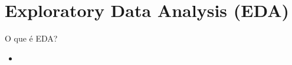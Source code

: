 \section{Exploratory Data Analysis (EDA)}


\begin{frame}
	\begin{block}{O que é EDA?}
		 \begin{itemize}
			  \item 
		  \end{itemize}
	\end{block}
\end{frame}








